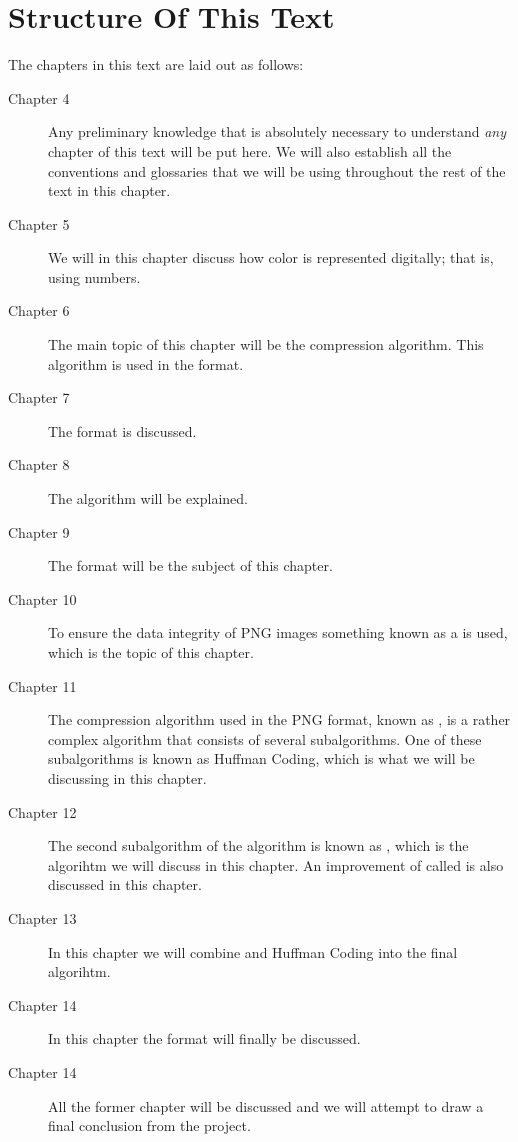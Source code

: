 \section{Structure Of This Text}

The chapters in this text are laid out as follows:

\begin{description}
\item[Chapter 4] Any preliminary knowledge that is absolutely
  necessary to understand \textit{any} chapter of this text will be
  put here. We will also establish all the conventions and glossaries
  that we will be using throughout the rest of the text in this
  chapter.

\item[Chapter 5] We will in this chapter discuss how color is
  represented digitally; that is, using numbers.

\item[Chapter 6] The main topic of this chapter will be the \rle
  compression algorithm. This algorithm is used in the \tga format.

\item[Chapter 7] The \tga format is discussed.

\item[Chapter 8] The \lzw algorithm will be explained.

\item[Chapter 9] The \gif format will be the subject of this chapter.

\item[Chapter 10] To ensure the data integrity of PNG images something
  known as a \crc is used, which is the topic of this chapter.

\item[Chapter 11] The compression algorithm used in the PNG format,
  known as , is a rather complex algorithm that consists of
  several subalgorithms. One of these subalgorithms is known as
  Huffman Coding, which is what we will be discussing in this chapter.

\item[Chapter 12] The second subalgorithm of the  algorithm is
  known as \lzone, which is the algorihtm we will discuss in this
  chapter. An improvement of \lzone called \lzss is also discussed in
  this chapter.

\item[Chapter 13] In this chapter we will combine \lzone and Huffman
  Coding into the final  algorihtm.

\item[Chapter 14] In this chapter the \png format will finally be
  discussed.

\item[Chapter 14] All the former chapter will be discussed and we will
  attempt to draw a final conclusion from the project.

\end{description}

